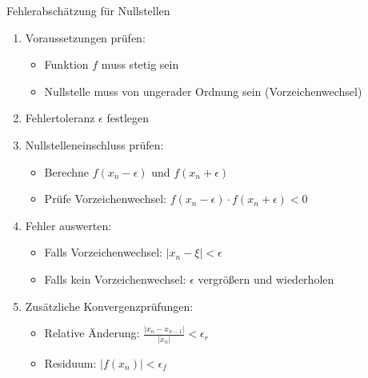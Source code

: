 \begin{KR}{Fehlerabschätzung für Nullstellen}
\begin{enumerate}
    \item Voraussetzungen prüfen:
    \begin{itemize}
        \item Funktion $f$ muss stetig sein
        \item Nullstelle muss von ungerader Ordnung sein (Vorzeichenwechsel)
    \end{itemize}
    \item Fehlertoleranz $\epsilon$ festlegen
    \item Nullstelleneinschluss prüfen:
    \begin{itemize}
        \item Berechne $f(x_n-\epsilon)$ und $f(x_n+\epsilon)$
        \item Prüfe Vorzeichenwechsel: $f(x_n-\epsilon) \cdot f(x_n+\epsilon) < 0$
    \end{itemize}
    \item Fehler auswerten:
    \begin{itemize}
        \item Falls Vorzeichenwechsel: $|x_n-\xi| < \epsilon$
        \item Falls kein Vorzeichenwechsel: $\epsilon$ vergrößern und wiederholen
    \end{itemize}
    \item Zusätzliche Konvergenzprüfungen:
    \begin{itemize}
        \item Relative Änderung: $\frac{|x_n-x_{n-1}|}{|x_n|} < \epsilon_r$
        \item Residuum: $|f(x_n)| < \epsilon_f$
    \end{itemize}
\end{enumerate}
\end{KR}

